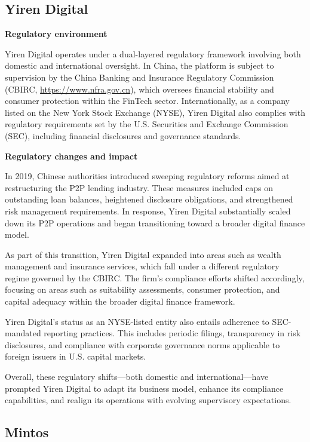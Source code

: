 \documentclass[pdflatex,sn-apa]{sn-jnl}%
\theoremstyle{thmstyleone}%
\theoremstyle{thmstyletwo}%
\theoremstyle{thmstylethree}%
\begin{document}
\subsection{Yiren Digital}

\textbf{Regulatory environment}

Yiren Digital operates under a dual-layered regulatory framework involving both domestic and international oversight. In China, the platform is subject to supervision by the China Banking and Insurance Regulatory Commission (CBIRC, \url{https://www.nfra.gov.cn}), which oversees financial stability and consumer protection within the FinTech sector. Internationally, as a company listed on the New York Stock Exchange (NYSE), Yiren Digital also complies with regulatory requirements set by the U.S. Securities and Exchange Commission (SEC), including financial disclosures and governance standards.

\textbf{Regulatory changes and impact}

In 2019, Chinese authorities introduced sweeping regulatory reforms aimed at restructuring the P2P lending industry. These measures included caps on outstanding loan balances, heightened disclosure obligations, and strengthened risk management requirements. In response, Yiren Digital substantially scaled down its P2P operations and began transitioning toward a broader digital finance model.

As part of this transition, Yiren Digital expanded into areas such as wealth management and insurance services, which fall under a different regulatory regime governed by the CBIRC. The firm’s compliance efforts shifted accordingly, focusing on areas such as suitability assessments, consumer protection, and capital adequacy within the broader digital finance framework.

Yiren Digital’s status as an NYSE-listed entity also entails adherence to SEC-mandated reporting practices. This includes periodic filings, transparency in risk disclosures, and compliance with corporate governance norms applicable to foreign issuers in U.S. capital markets.

Overall, these regulatory shifts—both domestic and international—have prompted Yiren Digital to adapt its business model, enhance its compliance capabilities, and realign its operations with evolving supervisory expectations.

\subsection{Mintos}
\end{document}
